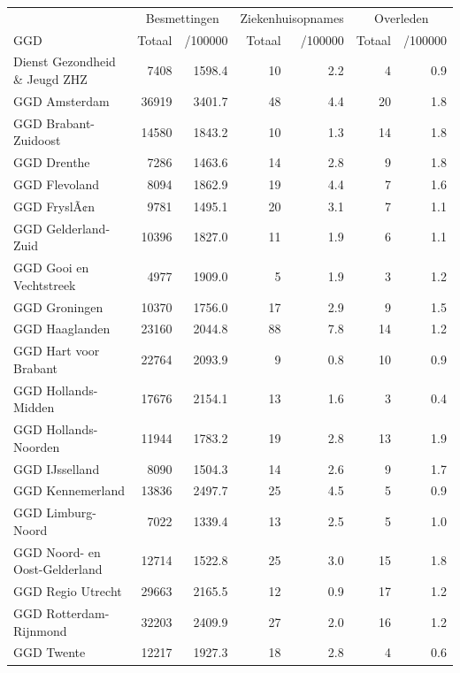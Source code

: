 \documentclass[
  english,
  man,floatsintext]{apa6}
\begin{document}
\begin{table}
\centering\begingroup\fontsize{10}{12}\selectfont

\begin{threeparttable}
\begin{tabular}{lrrrrrr}
\toprule
\multicolumn{1}{c}{ } & \multicolumn{2}{c}{Besmettingen} & \multicolumn{2}{c}{Ziekenhuisopnames} & \multicolumn{2}{c}{Overleden} \\
\cmidrule(l{3pt}r{3pt}){2-3} \cmidrule(l{3pt}r{3pt}){4-5} \cmidrule(l{3pt}r{3pt}){6-7}
GGD & Totaal & /100000 & Totaal & /100000 & Totaal & /100000\\
\midrule
Dienst Gezondheid \& Jeugd ZHZ & 7408 & 1598.4 & 10 & 2.2 & 4 & 0.9\\
GGD Amsterdam & 36919 & 3401.7 & 48 & 4.4 & 20 & 1.8\\
GGD Brabant-Zuidoost & 14580 & 1843.2 & 10 & 1.3 & 14 & 1.8\\
GGD Drenthe & 7286 & 1463.6 & 14 & 2.8 & 9 & 1.8\\
GGD Flevoland & 8094 & 1862.9 & 19 & 4.4 & 7 & 1.6\\
GGD FryslÃ¢n & 9781 & 1495.1 & 20 & 3.1 & 7 & 1.1\\
GGD Gelderland-Zuid & 10396 & 1827.0 & 11 & 1.9 & 6 & 1.1\\
GGD Gooi en Vechtstreek & 4977 & 1909.0 & 5 & 1.9 & 3 & 1.2\\
GGD Groningen & 10370 & 1756.0 & 17 & 2.9 & 9 & 1.5\\
GGD Haaglanden & 23160 & 2044.8 & 88 & 7.8 & 14 & 1.2\\
GGD Hart voor Brabant & 22764 & 2093.9 & 9 & 0.8 & 10 & 0.9\\
GGD Hollands-Midden & 17676 & 2154.1 & 13 & 1.6 & 3 & 0.4\\
GGD Hollands-Noorden & 11944 & 1783.2 & 19 & 2.8 & 13 & 1.9\\
GGD IJsselland & 8090 & 1504.3 & 14 & 2.6 & 9 & 1.7\\
GGD Kennemerland & 13836 & 2497.7 & 25 & 4.5 & 5 & 0.9\\
GGD Limburg-Noord & 7022 & 1339.4 & 13 & 2.5 & 5 & 1.0\\
GGD Noord- en Oost-Gelderland & 12714 & 1522.8 & 25 & 3.0 & 15 & 1.8\\
GGD Regio Utrecht & 29663 & 2165.5 & 12 & 0.9 & 17 & 1.2\\
GGD Rotterdam-Rijnmond & 32203 & 2409.9 & 27 & 2.0 & 16 & 1.2\\
GGD Twente & 12217 & 1927.3 & 18 & 2.8 & 4 & 0.6\\

\end{tabular}
\end{threeparttable}
\end{table}
\end{document}
